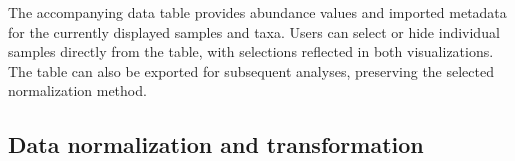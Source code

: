 \documentclass[pdflatex,sn-vancouver-num]{sn-jnl}%
\theoremstyle{thmstyleone}%
\theoremstyle{thmstyletwo}%
\theoremstyle{thmstylethree}%
\begin{document}
The accompanying data table provides abundance values and imported metadata for the currently displayed samples and taxa. Users can select or hide individual samples directly from the table, with selections reflected in both visualizations. The table can also be exported for subsequent analyses, preserving the selected normalization method.



\subsection{Data normalization and transformation} \label{sec:normalization}



\end{document}
